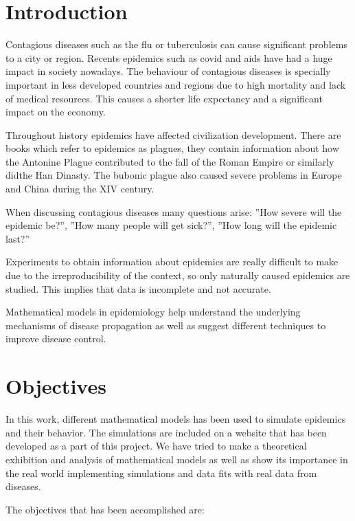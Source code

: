 \section*{Introduction}

Contagious diseases such as the flu or tuberculosis can cause significant problems to a city or region. Recents epidemics such as covid and aids have had a huge impact in society nowadays. The behaviour of contagious diseases is specially important in less developed countries and regions due to high mortality and lack of medical resources. This causes a shorter life expectancy and a significant impact on the economy.

Throughout history epidemics have affected civilization development. There are books which refer to epidemics as plagues, they contain information about how the Antonine Plague contributed to the fall of the Roman Empire or similarly didthe Han Dinasty. The bubonic plague also caused severe problems in Europe and China during the XIV century.

When discussing contagious diseases many questions arise: ''How severe will the epidemic be?'', ''How many people will get sick?'', ''How long will the epidemic last?''

Experiments to obtain information about epidemics are really difficult to make due to the irreproducibility of the context, so only naturally caused epidemics are studied. This implies that data is incomplete and not accurate.

Mathematical models in epidemiology help understand the underlying mechanisms of disease propagation as well as suggest different techniques to improve disease control.

\section*{Objectives}

In this work, different mathematical models has been used to simulate epidemics and their behavior. The simulations are included on a website that has been developed as a part of this project. We have tried to make a theoretical exhibition and analysis of mathematical models as well as show its importance in the real world implementing simulations and data fits with real data from diseases.

The objectives that has been accomplished are:

